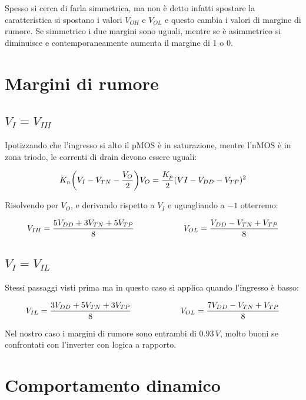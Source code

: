 Spesso si cerca di farla simmetrica, ma non è detto infatti spostare la caratteristica si spostano i valori $V_{OH}$ e $V_{OL}$ e questo cambia i valori di margine di rumore. Se simmetrico i due margini sono uguali, mentre se è asimmetrico si diminuisce e contemporaneamente aumenta il margine di 1 o 0.

\newpage
\section{Margini di rumore}

\subsection{$V_I = V_{IH}$}
Ipotizzando che l'ingresso si alto il pMOS è in saturazione, mentre l'nMOS è in zona triodo, le correnti di drain devono essere uguali:

 \begin{equation*}
     K_n\biggl(V_I - V_{TN} - \frac{V_O}{2}\biggl)V_O = \frac{K_p}{2}(VI -V_{DD} - V_{TP})^2
 \end{equation*}


 Risolvendo per $V_O$, e derivando rispetto a $V_I$ e uguagliando a $-1$ otterremo:

 \begin{equation*}
     V_{IH} = \frac{5V_{DD} + 3V_{TN} + 5V_{TP}}{8} \qquad\qquad\qquad V_{OL} = \frac{V_{DD} - V_{TN} + V_{TP}}{8}
 \end{equation*}

 \subsection{$V_I = V_{IL}$}

 Stessi passaggi visti prima ma in questo caso si applica quando l'ingresso è basso:

 \begin{equation*}
     V_{IL} = \frac{3V_{DD} + 5V_{TN} + 3V_{TP}}{8} \qquad\qquad\qquad V_{OL} = \frac{7V_{DD} - V_{TN} + V_{TP}}{8}
 \end{equation*}

Nel nostro caso i margini di rumore sono entrambi di $0.93\,V$, molto buoni se confrontati con l'inverter con logica a rapporto.

\section{Comportamento dinamico}


